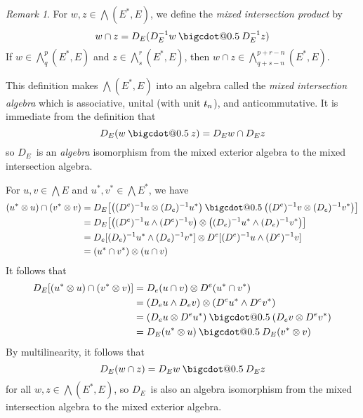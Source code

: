 \documentclass[letterpaper,12pt]{article}
\makeatletter
\newcommand{\bigcdot}[1]{\mathbin{\mathpalette\bigcdot@{#1}}}
\newcommand{\bigcdot@}[2]{%
  \sbox0{$#1\vcenter{}$}%
  \sbox2{$#1\cdot\m@th$}%
  \hbox{%
    \hfil
    \raise\ht0\hbox{%
      \scalebox{#2}{%
        \lower\ht0\hbox{$#1\bullet\m@th$}%
      }%
    }%
    \hfil
  }%
}
\newcommand{\sect}{\cap}
\newcommand{\tprod}{\otimes}
\newcommand{\eprod}{\wedge}
\newcommand{\bigeprod}{\bigwedge}
\newcommand{\medeprod}{{\textstyle\bigeprod}}
\newcommand{\mprod}{\bigcdot{0.5}}
\newcommand{\stroked}[1]{\mathrlap{\text{\kern0.05em-}}#1}
\newcommand{\unit}{\stroked{t}}
\theoremstyle{definition}
\theoremstyle{remark}
\newtheorem*{rmk}{Remark}
\makeatother
\begin{document}
\begin{rmk}
For \(w,z\in\medeprod(E^*,E)\), we define the \emph{mixed intersection product} by
\[w\sect z=D_E(D_E^{-1}w\mprod D_E^{-1}z)\]
If \(w\in\medeprod^p_q(E^*,E)\) and \(z\in\medeprod^r_s(E^*,E)\), then \(w\sect z\in\medeprod^{p+r-n}_{q+s-n}(E^*,E)\).

This definition makes \(\medeprod(E^*,E)\) into an algebra called the \emph{mixed intersection algebra} which is associative, unital (with unit \(\unit_n\)), and anticommutative. It is immediate from the definition that
\[D_E(w\mprod z)=D_Ew\sect D_Ez\]
so \(D_E\)~is an \emph{algebra} isomorphism from the mixed exterior algebra to the mixed intersection algebra.

For \(u,v\in\medeprod E\) and \(u^*,v^*\in\medeprod E^*\), we have
\begin{align*}
(u^*\tprod u)\sect(v^*\tprod v)&=D_E\bigl[\bigl((D^e)^{-1}u\tprod(D_e)^{-1} u^*\bigr)\mprod\bigl((D^e)^{-1}v\tprod(D_e)^{-1}v^*\bigr)\bigr]\\
	&=D_E\bigl[\bigl((D^e)^{-1}u\eprod(D^e)^{-1}v\bigr)\tprod\bigl((D_e)^{-1}u^*\eprod(D_e)^{-1}v^*\bigr)\bigr]\\
	&=D_e[(D_e)^{-1}u^*\eprod(D_e)^{-1}v^*]\tprod D^e[(D^e)^{-1}u\eprod(D^e)^{-1}v]\\
	&=(u^*\sect v^*)\tprod(u\sect v)
\end{align*}
It follows that
\begin{align*}
D_E[(u^*\tprod u)\sect(v^*\tprod v)]&=D_e(u\sect v)\tprod D^e(u^*\sect v^*)\\
	&=(D_eu\eprod D_ev)\tprod(D^eu^*\eprod D^ev^*)\\
	&=(D_eu\tprod D^e u^*)\mprod(D_ev\tprod D^ev^*)\\
	&=D_E(u^*\tprod u)\mprod D_E(v^*\tprod v)
\end{align*}
By multilinearity, it follows that
\[D_E(w\sect z)=D_Ew\mprod D_Ez\]
for all \(w,z\in\medeprod(E^*,E)\), so \(D_E\)~is also an algebra isomorphism from the mixed intersection algebra to the mixed exterior algebra.
\end{rmk}
\end{document}
